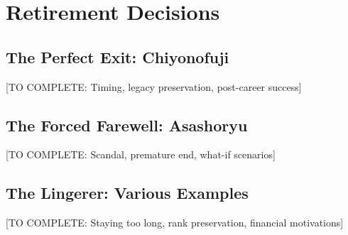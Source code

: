 \section{Retirement Decisions}

\subsection{The Perfect Exit: Chiyonofuji}

[TO COMPLETE: Timing, legacy preservation, post-career success]

\subsection{The Forced Farewell: Asashoryu}

[TO COMPLETE: Scandal, premature end, what-if scenarios]

\subsection{The Lingerer: Various Examples}

[TO COMPLETE: Staying too long, rank preservation, financial motivations]